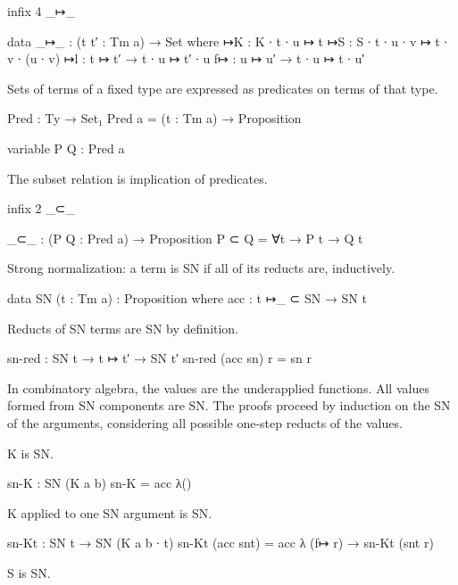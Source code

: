 \begin{code}
infix 4 _↦_

data _↦_ : (t t′ : Tm a) → Set where
  ↦K  : K ∙ t ∙ u      ↦ t
  ↦S  : S ∙ t ∙ u ∙ v  ↦ t ∙ v ∙ (u ∙ v)
  ↦l  : t ↦ t′  → t ∙ u ↦ t′ ∙ u
  f↦  : u ↦ u′  → t ∙ u ↦ t ∙ u′
\end{code}


Sets of terms of a fixed type are expressed as predicates on
terms of that type.

\begin{code}
Pred : Ty → Set₁
Pred a = (t : Tm a) → Proposition

variable P Q : Pred a
\end{code}

The subset relation is implication of predicates.

\begin{code}
infix 2 _⊂_

_⊂_ : (P Q : Pred a) → Proposition
P ⊂ Q = ∀{t} → P t → Q t
\end{code}

Strong normalization: a term is SN if all of its reducts are, inductively.

\begin{code}
data SN (t : Tm a) : Proposition where
  acc : t ↦_ ⊂ SN → SN t
\end{code}

Reducts of SN terms are SN by definition.

\begin{code}
sn-red : SN t → t ↦ t′ → SN t′
sn-red (acc sn) r = sn r
\end{code}

In combinatory algebra, the values are the underapplied functions.
All values formed from SN components are SN.
The proofs proceed by induction on the SN of the arguments,
considering all possible one-step reducts of the values.

K is SN.

\begin{code}
sn-K : SN (K {a} {b})
sn-K = acc λ()
\end{code}

K applied to one SN argument is SN.

\begin{code}
sn-Kt : SN t → SN (K {a} {b} ∙ t)
sn-Kt (acc snt) = acc λ{ (f↦ r) → sn-Kt (snt r) }
\end{code}

S is SN.

